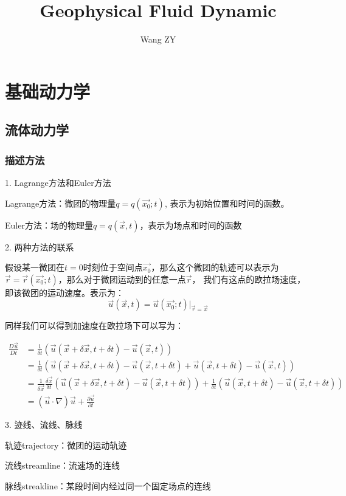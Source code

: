 \documentclass{article}
\title{Geophysical Fluid Dynamic}
\author{Wang ZY} %
\begin{document}
\maketitle
\tableofcontents
\newpage

\section{基础动力学}

\subsection{流体动力学}
\subsubsection{描述方法}
1. Lagrange方法和Euler方法

Lagrange方法：微团的物理量$q=q(\vec{x_0};t)$, 表示为初始位置和时间的函数。

Euler方法：场的物理量$q=q(\vec{x},t)$，表示为场点和时间的函数


2. 两种方法的联系

假设某一微团在$t=0$时刻位于空间点$\vec{x_0}$，那么这个微团的轨迹可以表示为
$\vec{r}=\vec{r}(\vec{x_0};t)$，那么对于微团运动到的任意一点$\vec{r}$，
我们有这点的欧拉场速度，即该微团的运动速度。表示为：
$$\vec{u}(\vec{x},t) = \vec{u}(\vec{x_0};t)|_{\vec{r}=\vec{x}}$$

同样我们可以得到加速度在欧拉场下可以写为：

\begin{align}\frac{D\vec{u}}{Dt}&=\frac{1}{\delta t}(\vec{u}(\vec{x}+\delta \vec{x},t+\delta t)-\vec{u}(\vec{x}, t))\\&=\frac{1}{\delta t}(\vec{u}(\vec{x}+\delta \vec{x},t+\delta t)-\vec{u}(\vec{x},t+\delta t)+\vec{u}(\vec{x},t+\delta t)-\vec{u}(\vec{x}, t))\\&=\frac{1}{\delta\vec{x}}\frac{\delta \vec{x}}{\delta t}(\vec{u}(\vec{x}+\delta \vec{x},t+\delta t)-\vec{u}(\vec{x},t+\delta t))+\frac{1}{\delta t}(\vec{u}(\vec{x},t+\delta t)-\vec{u}(\vec{x},t+\delta t))\\&=(\vec{u}\cdot\nabla)\vec{u}+\frac{\partial \vec{u}}{\partial t}\end{align}


3. 迹线、流线、脉线

轨迹trajectory：微团的运动轨迹

流线streamline：流速场的连线

脉线streakline：某段时间内经过同一个固定场点的连线
\end{document}
